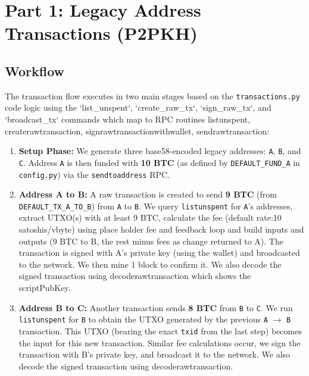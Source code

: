\documentclass[12pt]{article}
\begin{document}
\newpage

\section*{Part 1: Legacy Address Transactions (P2PKH)}

\subsection*{Workflow}
The transaction flow executes in two main stages based on the \texttt{transactions.py} code logic using the `list\_unspent`, `create\_raw\_tx`, `sign\_raw\_tx`, and `broadcast\_tx` commands which map to RPC routines listunspent, createrawtransaction, signrawtransactionwithwallet, sendrawtransaction:

\begin{enumerate}
    \item \textbf{Setup Phase:} We generate three base58-encoded legacy addresses: \texttt{A}, \texttt{B}, and \texttt{C}. Address \texttt{A} is then funded with \textbf{10 BTC} (as defined by \texttt{DEFAULT\_FUND\_A} in \texttt{config.py}) via the \texttt{sendtoaddress} RPC.
    
    \item \textbf{Address A to B:} A raw transaction is created to send \textbf{9 BTC} (from \texttt{DEFAULT\_TX\_A\_TO\_B}) from \texttt{A} to \texttt{B}. We query \texttt{listunspent} for \texttt{A}'s addresses, extract UTXO(s) with at least 9 BTC, calculate the fee (default rate:10 satoshis/vbyte) using place holder fee and feedback loop and build inputs and outputs (9 BTC to B, the rest minus fees as change returned to A). The transaction is signed with A's private key (using the wallet) and broadcasted to the network. We then mine 1 block to confirm it. We also decode the signed transaction using decoderawtransaction which shows the scriptPubKey.
    
    \item \textbf{Address B to C:} Another transaction sends \textbf{8 BTC} from \texttt{B} to \texttt{C}. We run \texttt{listunspent} for \texttt{B} to obtain the UTXO generated by the previous \texttt{A} $\rightarrow$ \texttt{B} transaction. This UTXO (bearing the exact \texttt{txid} from the last step) becomes the input for this new transaction. Similar fee calculations occur, we sign the transaction with B's private key, and broadcast it to the network. We also decode the signed transaction using decoderawtransaction.
\end{enumerate}
\end{document}
